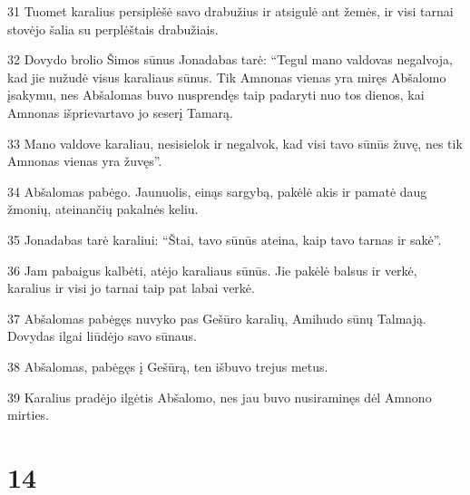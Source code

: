 \par 31 Tuomet karalius persiplėšė savo drabužius ir atsigulė ant žemės, ir visi tarnai stovėjo šalia su perplėštais drabužiais. 
\par 32 Dovydo brolio Šimos sūnus Jonadabas tarė: “Tegul mano valdovas negalvoja, kad jie nužudė visus karaliaus sūnus. Tik Amnonas vienas yra miręs Abšalomo įsakymu, nes Abšalomas buvo nusprendęs taip padaryti nuo tos dienos, kai Amnonas išprievartavo jo seserį Tamarą. 
\par 33 Mano valdove karaliau, nesisielok ir negalvok, kad visi tavo sūnūs žuvę, nes tik Amnonas vienas yra žuvęs”. 
\par 34 Abšalomas pabėgo. Jaunuolis, einąs sargybą, pakėlė akis ir pamatė daug žmonių, ateinančių pakalnės keliu. 
\par 35 Jonadabas tarė karaliui: “Štai, tavo sūnūs ateina, kaip tavo tarnas ir sakė”. 
\par 36 Jam pabaigus kalbėti, atėjo karaliaus sūnūs. Jie pakėlė balsus ir verkė, karalius ir visi jo tarnai taip pat labai verkė. 
\par 37 Abšalomas pabėgęs nuvyko pas Gešūro karalių, Amihudo sūnų Talmają. Dovydas ilgai liūdėjo savo sūnaus. 
\par 38 Abšalomas, pabėgęs į Gešūrą, ten išbuvo trejus metus. 
\par 39 Karalius pradėjo ilgėtis Abšalomo, nes jau buvo nusiraminęs dėl Amnono mirties.



\chapter{14}


